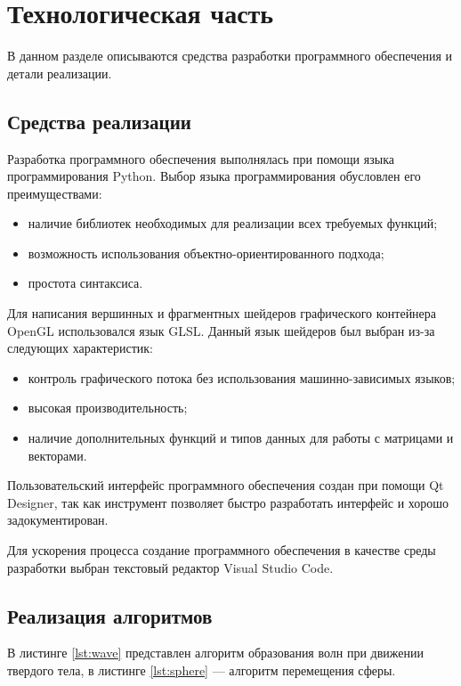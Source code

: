\chapter{Технологическая часть}

В данном разделе описываются средства разработки программного обеспечения и детали реализации.

\section{Средства реализации}

Разработка программного обеспечения выполнялась при помощи языка программирования Python. Выбор языка программирования обусловлен его преимуществами:

\begin{itemize}
	\item наличие библиотек необходимых для реализации всех требуемых функций;
	\item возможность использования объектно-ориентированного подхода;
	\item простота синтаксиса.
\end{itemize}

Для написания вершинных и фрагментных шейдеров графического контейнера OpenGL использовался язык GLSL. Данный язык шейдеров был выбран из-за следующих характеристик:

\begin{itemize}
	\item контроль графического потока без использования машинно-зависимых языков;
	\item высокая производительность;
	\item наличие дополнительных функций и типов данных для работы с матрицами и векторами.
\end{itemize}

Пользовательский интерфейс программного обеспечения создан при помощи Qt Designer, так как инструмент позволяет быстро разработать интерфейс и хорошо задокументирован.

Для ускорения процесса создание программного обеспечения в качестве среды разработки выбран текстовый редактор Visual Studio Code.

\section{Реализация алгоритмов}

В листинге \ref{lst:wave} представлен алгоритм образования волн при движении твердого тела, в листинге \ref{lst:sphere} --- алгоритм перемещения сферы.

